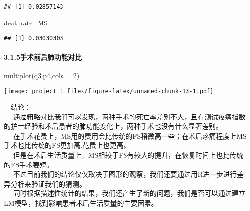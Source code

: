 \documentclass[
]{article}
\newenvironment{Shaded}{\begin{snugshade}}{\end{snugshade}}
\newcommand{\AttributeTok}[1]{\textcolor[rgb]{0.77,0.63,0.00}{#1}}
\newcommand{\DecValTok}[1]{\textcolor[rgb]{0.00,0.00,0.81}{#1}}
\newcommand{\FunctionTok}[1]{\textcolor[rgb]{0.00,0.00,0.00}{#1}}
\newcommand{\NormalTok}[1]{#1}
\newcommand{\OtherTok}[1]{\textcolor[rgb]{0.56,0.35,0.01}{#1}}
\newcommand{\SpecialCharTok}[1]{\textcolor[rgb]{0.00,0.00,0.00}{#1}}
\newcommand{\StringTok}[1]{\textcolor[rgb]{0.31,0.60,0.02}{#1}}
\begin{document}
\begin{Shaded}
\end{Shaded}

\begin{verbatim}
## [1] 0.02857143
\end{verbatim}

\begin{Shaded}
\begin{Highlighting}[]
\NormalTok{deathrate\_MS}
\end{Highlighting}
\end{Shaded}

\begin{verbatim}
## [1] 0.03030303
\end{verbatim}

\hypertarget{ux624bux672fux524dux540eux80baux529fux80fdux5bf9ux6bd4}{%
\paragraph{3.1.5手术前后肺功能对比}\label{ux624bux672fux524dux540eux80baux529fux80fdux5bf9ux6bd4}}

\begin{Shaded}
\begin{Highlighting}[]
\FunctionTok{multiplot}\NormalTok{(q3,p4,}\AttributeTok{cols =} \DecValTok{2}\NormalTok{)}
\end{Highlighting}
\end{Shaded}

\texttt{[image: project\_1\_files/figure-latex/unnamed-chunk-13-1.pdf]}

 结论：\\
 
通过粗略对比我们可以发现，两种手术的死亡率差别不大，且在测试疼痛指数的护士经验和术后患者的肺功能变化上，两种手术也没有什么显著差别。\\
 
在手术花费上，MS用的费用会比传统的FS稍微高一些；在术后疼痛程度上MS手术也比传统的FS更加高,花费上也更高。\\
 
但是在术后生活质量上，MS相较于FS有较大的提升，在恢复时间上也比传统的FS手术要短。\\
 
不过目前我们的结论仅仅取决于图形的观察，我们还要通过用R进一步进行差异分析来验证我们的猜测。\\
 
同时根据描述性统计的结果，我们还产生了新的问题，我们是否可以通过建立LM模型，找到影响患者术后生活质量的主要因素。
\end{document}
